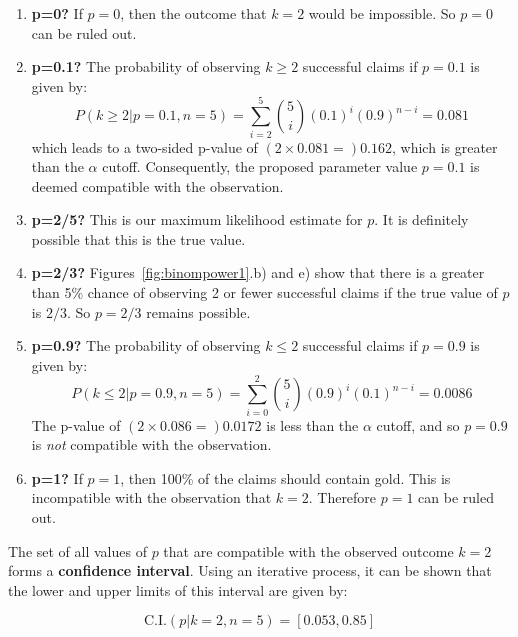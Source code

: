 \begin{enumerate}
\item{\bf p=0?} If $p=0$, then the outcome that $k=2$ would be
  impossible.  So $p=0$ can be ruled out.
\item{\bf p=0.1?} The probability of observing ${k}\geq{2}$ successful
  claims if $p=0.1$ is given by:
  \[
  P({k}\geq{2}|p=0.1,n=5) =
  \sum\limits_{i=2}^{5}\binom{5}{i}(0.1)^i(0.9)^{n-i} = 0.081
  \]
  which leads to a two-sided p-value of $(2\times{0.081}=)0.162$,
  which is greater than the $\alpha$ cutoff. Consequently, the
  proposed parameter value $p=0.1$ is deemed compatible with the
  observation.
\item{\bf p=2/5?} This is our maximum likelihood estimate for $p$.  It
  is definitely possible that this is the true value.
\item{\bf p=2/3?} Figures~\ref{fig:binompower1}.b) and e) show that
  there is a greater than 5\% chance of observing 2 or fewer
  successful claims if the true value of $p$ is $2/3$. So $p=2/3$
  remains possible.
\item{\bf p=0.9?} The probability of observing ${k}\leq{2}$ successful
  claims if $p=0.9$ is given by:
  \[
  P({k}\leq{2}|p=0.9,n=5) =
  \sum\limits_{i=0}^{2}\binom{5}{i}(0.9)^i(0.1)^{n-i} = 0.0086
  \]
  The p-value of $(2\times{0.086}=)0.0172$ is less than the $\alpha$
  cutoff, and so $p=0.9$ is \emph{not} compatible with the
  observation.
\item{\bf p=1?} If $p=1$, then 100\% of the claims should contain
  gold. This is incompatible with the observation that $k=2$.
  Therefore $p=1$ can be ruled out.
\end{enumerate}

The set of all values of $p$ that are compatible with the observed
outcome $k=2$ forms a \textbf{confidence interval}. Using an iterative
process, it can be shown that the lower and upper limits of this
interval are given by:

\[
\mbox{C.I.}(p|k=2,n=5) = [0.053, 0.85]
\]

